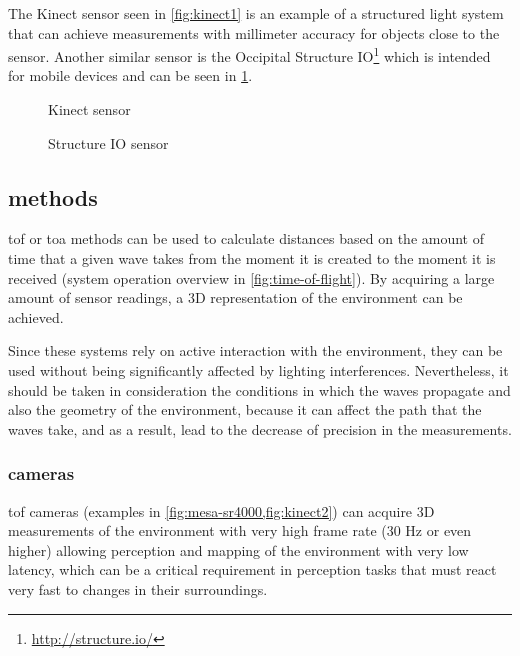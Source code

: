 The Kinect sensor seen in \cref{fig:kinect1} is an example of a structured light system that can achieve measurements with millimeter accuracy for objects close to the sensor. Another similar sensor is the Occipital Structure IO\footnote{\url{http://structure.io/}} which is intended for mobile devices and can be seen in \cref{fig:structure-io}.


\begin{figure}[H]
	\begin{floatrow}[2]
		{\caption[Kinect 2 sensor]{Kinect sensor\protect\footnotemark}\label{fig:kinect1}}

		{\caption[Structure IO sensor]{Structure IO sensor\protect\footnotemark}\label{fig:structure-io}}
	\end{floatrow}
\end{figure}


\subsection{ methods}\label{sec:tof-methods}

\gls{tof} or \gls{toa} methods can be used to calculate distances based on the amount of time that a given wave takes from the moment it is created to the moment it is received (system operation overview in \cref{fig:time-of-flight}). By acquiring a large amount of sensor readings, a 3D representation of the environment can be achieved.

Since these systems rely on active interaction with the environment, they can be used without being significantly affected by lighting interferences. Nevertheless, it should be taken in consideration the conditions in which the waves propagate and also the geometry of the environment, because it can affect the path that the waves take, and as a result, lead to the decrease of precision in the measurements.


\subsubsection{ cameras}

\gls{tof} cameras (examples in \cref{fig:mesa-sr4000,fig:kinect2}) can acquire 3D measurements of the environment with very high frame rate (30 Hz or even higher) allowing perception and mapping of the environment with very low latency, which can be a critical requirement in perception tasks that must react very fast to changes in their surroundings.

